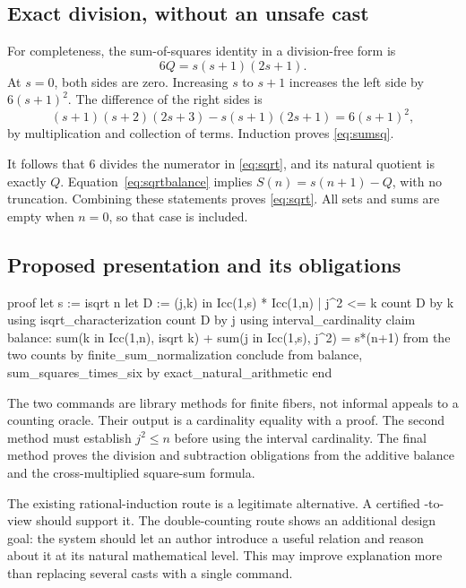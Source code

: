 \documentclass[11pt,a4paper]{article}
\newcommand{\code}[1]{\texttt{\detokenize{#1}}}
\theoremstyle{remark}
\begin{document}
\subsection{Exact division, without an unsafe cast}

For completeness, the sum-of-squares identity in a division-free form is
\begin{equation}\label{eq:sumsq}
 6Q=s(s+1)(2s+1).
\end{equation}
At \(s=0\), both sides are zero. Increasing \(s\) to \(s+1\) increases the left side by \(6(s+1)^2\). The difference of the right sides is
\[
 (s+1)(s+2)(2s+3)-s(s+1)(2s+1)=6(s+1)^2,
\]
by multiplication and collection of terms. Induction proves \eqref{eq:sumsq}.

It follows that \(6\) divides the numerator in \eqref{eq:sqrt}, and its natural quotient is exactly \(Q\). Equation~\eqref{eq:sqrtbalance} implies
\(S(n)=s(n+1)-Q\), with no truncation. Combining these statements proves \eqref{eq:sqrt}. All sets and sums are empty when \(n=0\), so that case is included.

\subsection{Proposed presentation and its obligations}

\begin{Code}
proof
  let s := isqrt n
  let D := {(j,k) in Icc(1,s) * Icc(1,n) | j^2 <= k}
  count D by k using isqrt_characterization
  count D by j using interval_cardinality
  claim balance:
      sum(k in Icc(1,n), isqrt k)
      + sum(j in Icc(1,s), j^2) = s*(n+1)
    from the two counts by finite_sum_normalization
  conclude from balance, sum_squares_times_six
    by exact_natural_arithmetic
end
\end{Code}
The two \code{count} commands are library methods for finite fibers, not informal appeals to a counting oracle. Their output is a cardinality equality with a proof. The second method must establish \(j^2\le n\) before using the interval cardinality. The final method proves the division and subtraction obligations from the additive balance and the cross-multiplied square-sum formula.

The existing rational-induction route is a legitimate alternative. A certified \code{Nat}-to-\code{Rat} view should support it. The double-counting route shows an additional design goal: the system should let an author introduce a useful relation and reason about it at its natural mathematical level. This may improve explanation more than replacing several casts with a single command.
\end{document}
